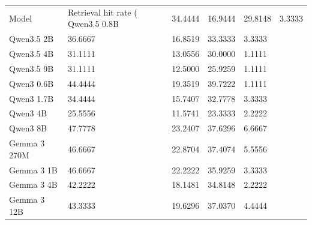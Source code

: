 \begin{tabular}{llrrl}
\toprule
Model & Retrieval hit rate (%
\midrule
Qwen3.5 0.8B & 34.4444 & 16.9444 & 29.8148 & 3.3333 \\
Qwen3.5 2B & 36.6667 & 16.8519 & 33.3333 & 3.3333 \\
Qwen3.5 4B & 31.1111 & 13.0556 & 30.0000 & 1.1111 \\
Qwen3.5 9B & 31.1111 & 12.5000 & 25.9259 & 1.1111 \\
Qwen3 0.6B & 44.4444 & 19.3519 & 39.7222 & 1.1111 \\
Qwen3 1.7B & 34.4444 & 15.7407 & 32.7778 & 3.3333 \\
Qwen3 4B & 25.5556 & 11.5741 & 23.3333 & 2.2222 \\
Qwen3 8B & 47.7778 & 23.2407 & 37.6296 & 6.6667 \\
Gemma 3 270M & 46.6667 & 22.8704 & 37.4074 & 5.5556 \\
Gemma 3 1B & 46.6667 & 22.2222 & 35.9259 & 3.3333 \\
Gemma 3 4B & 42.2222 & 18.1481 & 34.8148 & 2.2222 \\
Gemma 3 12B & 43.3333 & 19.6296 & 37.0370 & 4.4444 \\
\bottomrule
\end{tabular}
